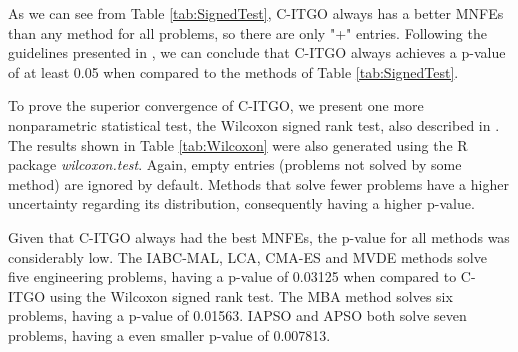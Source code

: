 

As we can see from Table \ref{tab:SignedTest}, C-ITGO always has a better MNFEs than any method for all problems, so there are only "+" entries. Following the guidelines presented in \cite{Friedman}, we can conclude that C-ITGO always achieves a p-value of at least 0.05 when compared to the methods of Table \ref{tab:SignedTest}.


To prove the superior convergence of C-ITGO, we present one more nonparametric statistical test, the Wilcoxon signed rank test, also described in \cite{Friedman}. The results shown in Table \ref{tab:Wilcoxon} were also generated using the R package \textit{wilcoxon.test}. Again, empty entries (problems not solved by some method) are ignored by default. Methods that solve fewer problems have a higher uncertainty regarding its distribution, consequently having a higher p-value.


Given that C-ITGO always had the best MNFEs, the p-value for all methods was considerably low. The IABC-MAL, LCA, CMA-ES and MVDE methods solve five engineering problems, having a p-value of 0.03125 when compared to C-ITGO using the Wilcoxon signed rank test. The MBA method solves six problems, having a p-value of 0.01563. IAPSO and APSO both solve seven problems, having a even smaller p-value of 0.007813.



